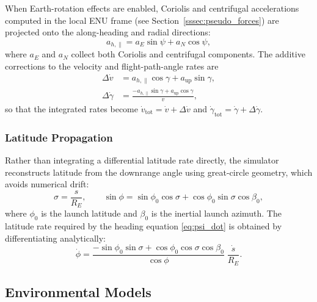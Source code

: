 When Earth-rotation effects are enabled, Coriolis and centrifugal
accelerations computed in the local ENU frame (see
Section~\ref{sssec:pseudo_forces}) are projected onto the along-heading and
radial directions:
\begin{equation}
  a_{h,\parallel} = a_E\sin\psi + a_N\cos\psi,
  \label{eq:a_parallel}
\end{equation}
where $a_E$ and $a_N$ collect both Coriolis and centrifugal components.
The additive corrections to the velocity and flight-path-angle rates are
\begin{align}
  \Delta\dot v     &= a_{h,\parallel}\cos\gamma + a_{\text{up}}\sin\gamma,
                    \label{eq:dv_pseudo}\\[3pt]
  \Delta\dot\gamma &= \frac{-a_{h,\parallel}\sin\gamma
                      + a_{\text{up}}\cos\gamma}{v},
                    \label{eq:dgamma_pseudo}
\end{align}
so that the integrated rates become
$\dot v_{\text{tot}} = \dot v + \Delta\dot v$ and
$\dot\gamma_{\text{tot}} = \dot\gamma + \Delta\dot\gamma$.

\subsubsection{Latitude Propagation}

Rather than integrating a differential latitude rate directly, the simulator
reconstructs latitude from the downrange angle using great-circle geometry,
which avoids numerical drift:
\begin{equation}
  \sigma = \frac{s}{R_E}, \qquad
  \sin\phi = \sin\phi_0\cos\sigma + \cos\phi_0\sin\sigma\cos\beta_0,
  \label{eq:lat_recon}
\end{equation}
where $\phi_0$ is the launch latitude and $\beta_0$ is the inertial launch
azimuth.  The latitude rate required by the heading equation
\eqref{eq:psi_dot} is obtained by differentiating analytically:
\begin{equation}
  \dot\phi = \frac{-\sin\phi_0\sin\sigma
    + \cos\phi_0\cos\sigma\cos\beta_0}{\cos\phi}\;\frac{\dot s}{R_E}.
  \label{eq:phidot}
\end{equation}

\subsection{Environmental Models}
\label{ssec:env_models}

